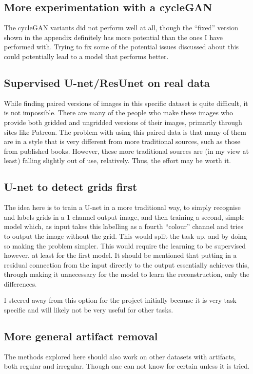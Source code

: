 \subsection{More experimentation with a cycleGAN}
The cycleGAN variants did not perform well at all, though the ``fixed'' version shown in the appendix definitely has more potential than the ones I have performed with. Trying to fix some of the potential issues discussed about this could potentially lead to a model that performs better.

\subsection{Supervised U-net/ResUnet on real data}
While finding paired versions of images in this specific dataset is quite difficult, it is not impossible. There are many of the people who make these images who provide both gridded and ungridded versions of their images, primarily through sites like Patreon. The problem with using this paired data is that many of them are in a style that is very different from more traditional sources, such as those from published books. However, these more traditional sources are (in my view at least) falling slightly out of use, relatively. Thus, the effort may be worth it.

\subsection{U-net to detect grids first}
The idea here is to train a U-net in a more traditional way, to simply recognise and labels grids in a 1-channel output image, and then training a second, simple model which, as input takes this labelling as a fourth ``colour'' channel and tries to output the image without the grid. This would split the task up, and by doing so making the problem simpler. This would require the learning to be supervised however, at least for the first model. It should be mentioned that putting in a residual connection from the input directly to the output essentially achieves this, through making it unnecessary for the model to learn the reconstruction, only the differences.

I steered away from this option for the project initially because it is very task-specific and will likely not be very useful for other tasks.

\subsection{More general artifact removal}
The methods explored here should also work on other datasets with artifacts, both regular and irregular. Though one can not know for certain unless it is tried.
